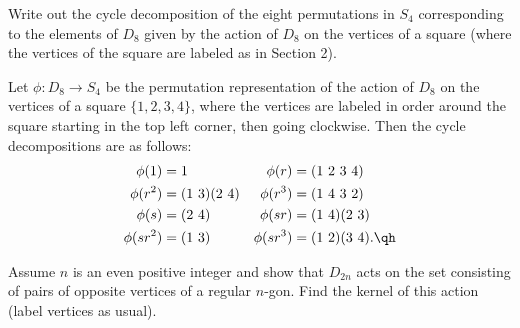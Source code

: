 \begin{exercise}\label{ex1.7.11}
    Write out the cycle decomposition of the eight permutations in $S_4$ corresponding to the elements of $D_8$ given by the action of $D_8$ on the vertices of a square (where the vertices of the square are labeled as in Section 2).
\end{exercise}

\begin{sol}
    Let $\phi : D_8 \to S_4$ be the permutation representation of the action of $D_8$ on the vertices of a square $\{1, 2, 3, 4\}$, where the vertices are labeled in order around the square starting in the top left corner, then going clockwise. Then the cycle decompositions are as follows:
    \begin{align*}
        \phi(1) & = 1 & \phi(r) & = (1\ 2\ 3\ 4) \\
        \phi(r^2) & = (1\ 3)(2\ 4) & \phi(r^3) & = (1\ 4\ 3\ 2) \\
        \phi(s) & = (2\ 4) & \phi(sr) & = (1\ 4)(2\ 3) \\
        \phi(sr^2) & = (1\ 3) & \phi(sr^3) & = (1\ 2)(3\ 4). \qh
    \end{align*}
\end{sol}

\begin{exercise} \label{ex1.7.12}
    Assume $n$ is an even positive integer and show that $D_{2n}$ acts on the set consisting of pairs of opposite vertices of a regular $n$-gon. Find the kernel of this action (label vertices as usual).
\end{exercise}

